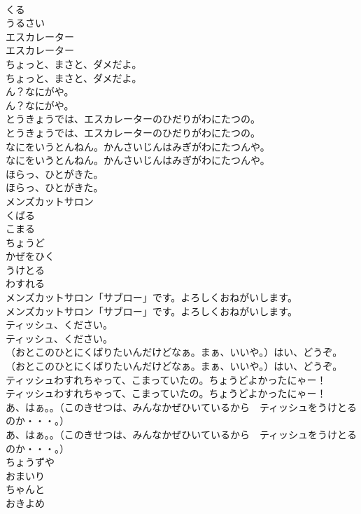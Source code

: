 \documentclass[8pt]{extreport}
\begin{document}
\begin{CJK}{UTF8}{min}
\\	くる
\\	うるさい
\\	エスカレーター
\\	エスカレーター
\\	ちょっと、まさと、ダメだよ。
\\	ちょっと、まさと、ダメだよ。
\\	ん？なにがや。
\\	ん？なにがや。
\\	とうきょうでは、エスカレーターのひだりがわにたつの。
\\	とうきょうでは、エスカレーターのひだりがわにたつの。
\\	なにをいうとんねん。かんさいじんはみぎがわにたつんや。
\\	なにをいうとんねん。かんさいじんはみぎがわにたつんや。
\\	ほらっ、ひとがきた。
\\	ほらっ、ひとがきた。
\\	メンズカットサロン
\\	くばる
\\	こまる
\\	ちょうど
\\	かぜをひく
\\	うけとる
\\	わすれる
\\	メンズカットサロン「サブロー」です。よろしくおねがいします。
\\	メンズカットサロン「サブロー」です。よろしくおねがいします。
\\	ティッシュ、ください。
\\	ティッシュ、ください。
\\	（おとこのひとにくばりたいんだけどなぁ。まぁ、いいや。）はい、どうぞ。
\\	（おとこのひとにくばりたいんだけどなぁ。まぁ、いいや。）はい、どうぞ。
\\	ティッシュわすれちゃって、こまっていたの。ちょうどよかったにゃー！
\\	ティッシュわすれちゃって、こまっていたの。ちょうどよかったにゃー！
\\	あ、はぁ。。（このきせつは、みんなかぜひいているから　ティッシュをうけとるのか・・・。）
\\	あ、はぁ。。（このきせつは、みんなかぜひいているから　ティッシュをうけとるのか・・・。）
\\	ちょうずや
\\	おまいり
\\	ちゃんと
\\	おきよめ

\end{CJK}
\end{document}

